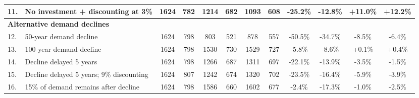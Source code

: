 \begin{tabular} {l l c c c c c c c c c c}
11. & No investment + discounting at 3\% & 1624 & 782 & 1214 & 682 & 1093 & 608 & -25.2\% & -12.8\% & +11.0\% & +12.2\% \\ 
\midrule 
\multicolumn{4}{l}{\textbf{Alternative demand declines}} & & & & & & & & \\ 
12. & 50-year demand decline & 1624 & 798 & 803 & 521 & 878 & 557 & -50.5\% & -34.7\% & -8.5\% & -6.4\% \\ 
13. & 100-year demand decline & 1624 & 798 & 1530 & 730 & 1529 & 727 & -5.8\% & -8.6\% & +0.1\% & +0.4\% \\ 
14. & Decline delayed 5 years & 1624 & 798 & 1266 & 687 & 1311 & 697 & -22.1\% & -13.9\% & -3.5\% & -1.5\% \\ 
15. & Decline delayed 5 years; 9\% discounting & 1624 & 807 & 1242 & 674 & 1320 & 702 & -23.5\% & -16.4\% & -5.9\% & -3.9\% \\ 
16. & 15\% of demand remains after decline & 1624 & 798 & 1586 & 660 & 1602 & 677 & -2.4\% & -17.3\% & -1.0\% & -2.5\% \\ 
\midrule 
\end{tabular}